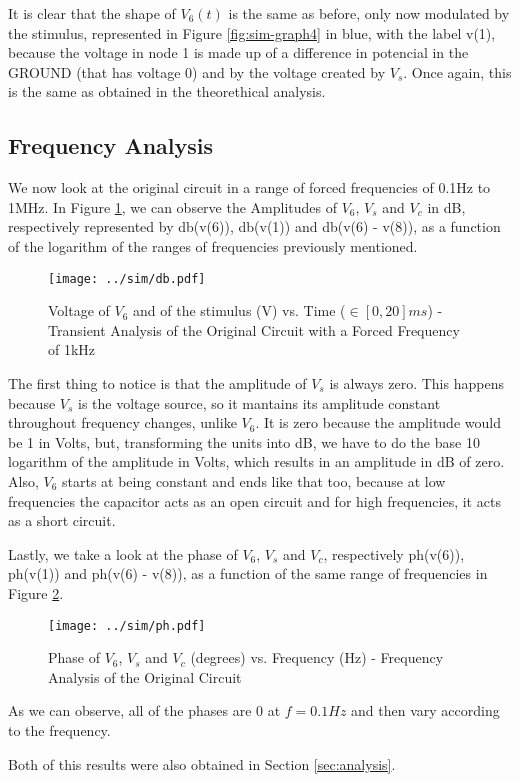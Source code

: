 It is clear that the shape of $V_6(t)$ is the same as before, only now modulated by the stimulus, represented in Figure \ref{fig:sim-graph4} in blue, with the label v(1), because the voltage in node 1 is made up of a difference in potencial in the GROUND (that has voltage 0) and by the voltage created by $V_s$. Once again, this is the same as obtained in the theorethical analysis.

\subsection{Frequency Analysis}
\label{subsec:sim_freq}

We now look at the original circuit in a range of forced frequencies of 0.1Hz to 1MHz. In Figure \ref{fig:sim_db}, we can observe the Amplitudes of $V_6$, $V_s$ and $V_c$ in dB, respectively represented by db(v(6)), db(v(1)) and db(v(6) - v(8)), as a function of the logarithm of the ranges of frequencies previously mentioned.

\begin{figure}[H] \centering
\texttt{[image: ../sim/db.pdf]}
\caption{Voltage of $V_6$ and of the stimulus (V) vs. Time ($\in [0, 20]ms$) - Transient Analysis of the Original Circuit with a Forced Frequency of 1kHz}
\label{fig:sim_db}
\end{figure}

The first thing to notice is that the amplitude of $V_s$ is always zero. This happens because $V_s$ is the voltage source, so it mantains its amplitude constant throughout frequency changes, unlike $V_6$. It is zero because the amplitude would be 1 in Volts, but, transforming the units into dB, we have to do the base 10 logarithm of the amplitude in Volts, which results in an amplitude in dB of zero. Also, $V_6$ starts at being constant and ends like that too, because at low frequencies the capacitor acts as an open circuit and for high frequencies, it acts as a short circuit.
\par
Lastly, we take a look at the phase of $V_6$, $V_s$ and $V_c$, respectively ph(v(6)), ph(v(1)) and ph(v(6) - v(8)), as a function of the same range of frequencies in Figure \ref{fig:sim_ph}.

\begin{figure}[H] \centering
\texttt{[image: ../sim/ph.pdf]}
\caption{Phase of $V_6$, $V_s$ and $V_c$ (degrees) vs. Frequency (Hz) - Frequency Analysis of the Original Circuit}
\label{fig:sim_ph}
\end{figure}


As we can observe, all of the phases are 0 at $f=0.1Hz$ and then vary according to the frequency.
\par
Both of this results were also obtained in Section \ref{sec:analysis}.











